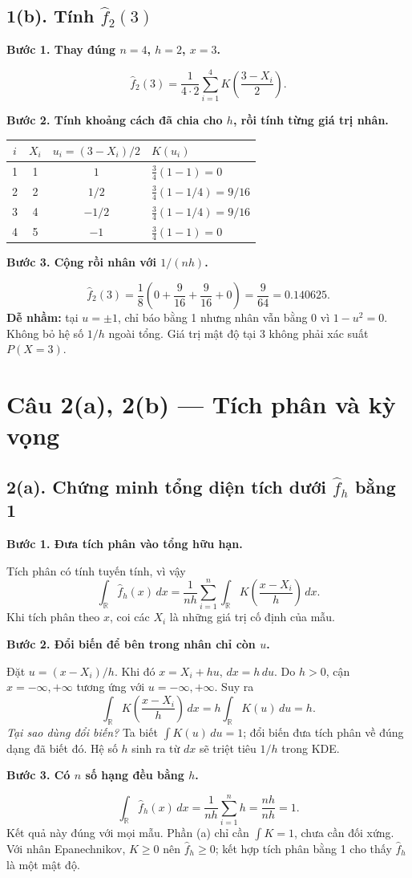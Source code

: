 \documentclass[11pt,a4paper]{article}
\newcommand{\R}{\mathbb R}
\newcommand{\fh}{\widehat f_h}
\newcommand{\buoc}[1]{\par\medskip\textbf{#1}\par}
\begin{document}
\subsection*{1(b). Tính $\widehat f_2(3)$}
\buoc{Bước 1. Thay đúng $n=4$, $h=2$, $x=3$.}
\[
\widehat f_2(3)=\frac1{4\cdot2}\sum_{i=1}^4K\!\left(\frac{3-X_i}{2}\right).
\]
\buoc{Bước 2. Tính khoảng cách đã chia cho $h$, rồi tính từng giá trị nhân.}
\begin{center}
\begin{tabular}{cccl}
\toprule
$i$ & $X_i$ & $u_i=(3-X_i)/2$ & $K(u_i)$\\
\midrule
1&1&$1$&$\frac34(1-1)=0$\\
2&2&$1/2$&$\frac34(1-1/4)=9/16$\\
3&4&$-1/2$&$\frac34(1-1/4)=9/16$\\
4&5&$-1$&$\frac34(1-1)=0$\\
\bottomrule
\end{tabular}
\end{center}
\buoc{Bước 3. Cộng rồi nhân với $1/(nh)$.}
\[
\boxed{\widehat f_2(3)=\frac18\left(0+\frac9{16}+\frac9{16}+0\right)
=\frac9{64}=0.140625.}
\]
\textbf{Dễ nhầm:} tại $u=\pm1$, chỉ báo bằng 1 nhưng nhân vẫn bằng 0 vì $1-u^2=0$. Không bỏ hệ số $1/h$ ngoài tổng. Giá trị mật độ tại 3 không phải xác suất $P(X=3)$.
\endgroup

\clearpage
\section*{Câu 2(a), 2(b) — Tích phân và kỳ vọng}
\subsection*{2(a). Chứng minh tổng diện tích dưới $\widehat f_h$ bằng 1}
\buoc{Bước 1. Đưa tích phân vào tổng hữu hạn.}
Tích phân có tính tuyến tính, vì vậy
\[
\int_{\R}\fh(x)\,dx
=\frac1{nh}\sum_{i=1}^n\int_{\R}K\!\left(\frac{x-X_i}{h}\right)\,dx.
\]
Khi tích phân theo $x$, coi các $X_i$ là những giá trị cố định của mẫu.

\buoc{Bước 2. Đổi biến để bên trong nhân chỉ còn $u$.}
Đặt $u=(x-X_i)/h$. Khi đó $x=X_i+hu$, $dx=h\,du$. Do $h>0$, cận $x=-\infty,+\infty$ tương ứng với $u=-\infty,+\infty$. Suy ra
\[
\int_{\R}K\!\left(\frac{x-X_i}{h}\right)\,dx
=h\int_{\R}K(u)\,du=h.
\]
\textit{Tại sao dùng đổi biến?} Ta biết $\int K(u)\,du=1$; đổi biến đưa tích phân về đúng dạng đã biết đó. Hệ số $h$ sinh ra từ $dx$ sẽ triệt tiêu $1/h$ trong KDE.

\buoc{Bước 3. Có $n$ số hạng đều bằng $h$.}
\[
\boxed{\int_{\R}\fh(x)\,dx=\frac1{nh}\sum_{i=1}^nh
=\frac{nh}{nh}=1.}
\]
Kết quả này đúng với mọi mẫu. Phần (a) chỉ cần $\int K=1$, chưa cần đối xứng. Với nhân Epanechnikov, $K\geq0$ nên $\fh\geq0$; kết hợp tích phân bằng 1 cho thấy $\fh$ là một mật độ.
\end{document}
